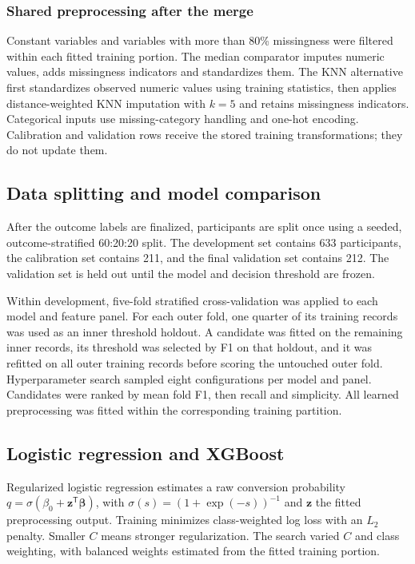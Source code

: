 \documentclass[11pt,a4paper]{article}
\begin{document}
\subsubsection*{Shared preprocessing after the merge}
Constant variables and variables with more than 80\% missingness were filtered within each fitted training portion. The median comparator imputes numeric values, adds missingness indicators and standardizes them. The KNN alternative first standardizes observed numeric values using training statistics, then applies distance-weighted KNN imputation with $k=5$ and retains missingness indicators. Categorical inputs use missing-category handling and one-hot encoding. Calibration and validation rows receive the stored training transformations; they do not update them.
\subsection{Data splitting and model comparison}
After the outcome labels are finalized, participants are split once using a seeded, outcome-stratified 60:20:20 split. The development set contains 633 participants, the calibration set contains 211, and the final validation set contains 212. The validation set is held out until the model and decision threshold are frozen.

Within development, five-fold stratified cross-validation was applied to each model and feature panel. For each outer fold, one quarter of its training records was used as an inner threshold holdout. A candidate was fitted on the remaining inner records, its threshold was selected by F1 on that holdout, and it was refitted on all outer training records before scoring the untouched outer fold. Hyperparameter search sampled eight configurations per model and panel. Candidates were ranked by mean fold F1, then recall and simplicity. All learned preprocessing was fitted within the corresponding training partition.

\subsection{Logistic regression and XGBoost}
Regularized logistic regression estimates a raw conversion probability $q=\sigma(\beta_0+\boldsymbol{z}^{\mathsf{T}}\boldsymbol{\beta})$, with $\sigma(s)=(1+\exp(-s))^{-1}$ and $\boldsymbol{z}$ the fitted preprocessing output. Training minimizes class-weighted log loss with an $L_2$ penalty. Smaller $C$ means stronger regularization. The search varied $C$ and class weighting, with balanced weights estimated from the fitted training portion.
\end{document}

